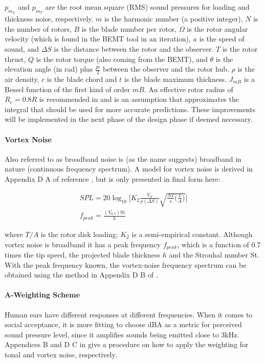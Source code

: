 $p_{m_L}$ and $p_{m_T}$ are the root mean square (RMS) sound pressures for loading and thickness noise, respectively. $m$ is the harmonic number (a positive integer), $N$ is the number of rotors, $B$ is the blade number per rotor, $\Omega$ is the rotor angular velocity (which is found in the BEMT tool in an iteration), $a$ is the speed of sound, and $\Delta S$ is the distance between the rotor and the observer. $T$ is the rotor thrust, $Q$ is the rotor torque (also coming from the BEMT), and $\theta$ is the elevation angle (in rad) plus $\frac{pi}{2}$ between the observer and the rotor hub. $\rho$ is the air density, $c$ is the blade chord and $t$ is the blade maximum thickness. $J_{mB}$ is a Bessel function of the first kind of order $mB$. An effective rotor radius of $R_e = 0.8 R$ is recommended in \cite{Brown2018} and is an assumption that approximates the integral that should be used for more accurate predictions. These improvements will be implemented in the next phase of the design phase if deemed necessary.


\paragraph{Vortex Noise} Also referred to as broadband noise is (as the name suggests) broadband in nature (continuous frequency spectrum). A model for vortex noise is derived in Appendix D A of reference \cite{Brown2018}, but is only presented in final form here:

\begin{align}
    SPL = 20 \log_{10} \Bigg[ K_2 \frac{V_T}{\rho (\Delta S)} \sqrt{\frac{NT}{s} \Big(\frac{T}{A} \Big)} \Bigg] \\
    f_{peak} = \frac{(V_{0.7})\text{St}}{h}
\end{align}

where $T/A$ is the rotor disk loading; $K_2$ is a semi-empirical constant. Although vortex noise is broadband it has a peak frequency $f_{peak}$, which is a function of 0.7 times the tip speed, the projected blade thickness $h$ and the Strouhal number St. With the peak frequency known, the vortex-noise frequency spectrum can be obtained using the method in Appendix D B of \cite{Brown2018}.


\paragraph{A-Weighting Scheme}

Human ears have different responses at different frequencies. When it comes to social acceptance, it is more fitting to choose dBA as a metric for perceived sound pressure level, since it amplifies sounds being emitted close to 3kHz. Appendices B and D C in \cite{Brown2018} give a procedure on how to apply the weighting for tonal and vortex noise, respectively.

